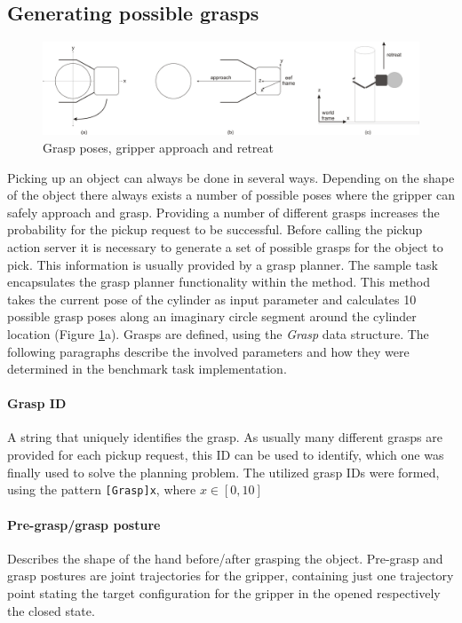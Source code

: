 \subsection{Generating possible grasps}

\begin{figure}[h]
	\centering
  	\includegraphics[width=1.0\textwidth]{images/grasp_a-c.jpg}
	\caption{Grasp poses, gripper approach and retreat}
	\label{fig:grasp_stages}
\end{figure}

Picking up an object can always be done in several ways. Depending on the shape of the object there always exists a number of possible poses where the gripper can safely approach and grasp. Providing a number of different grasps increases the probability for the pickup request to be successful. Before calling the pickup action server it is necessary to generate a set of possible grasps for the object to pick. This information is usually provided by a grasp planner. The sample task encapsulates the grasp planner functionality within the  method. This method takes the current pose of the cylinder as input parameter and calculates 10 possible grasp poses along an imaginary circle segment around the cylinder location (Figure \ref{fig:grasp_stages}a). Grasps are defined, using the \emph{Grasp} data structure. The following paragraphs describe the involved parameters and how they were determined in the benchmark task implementation.

\paragraph{Grasp ID} A string that uniquely identifies the grasp. As usually many different grasps are provided for each pickup request, this ID can be used to identify, which one was finally used to solve the planning problem. The utilized grasp IDs were formed, using the pattern \texttt{[Grasp]x}, where $x \in [0,10]$ 

\paragraph{Pre-grasp/grasp posture} Describes the shape of the hand before/after grasping the object.
Pre-grasp and grasp postures are joint trajectories for the gripper, containing just one trajectory point stating the target configuration for the gripper in the opened respectively the closed state.

